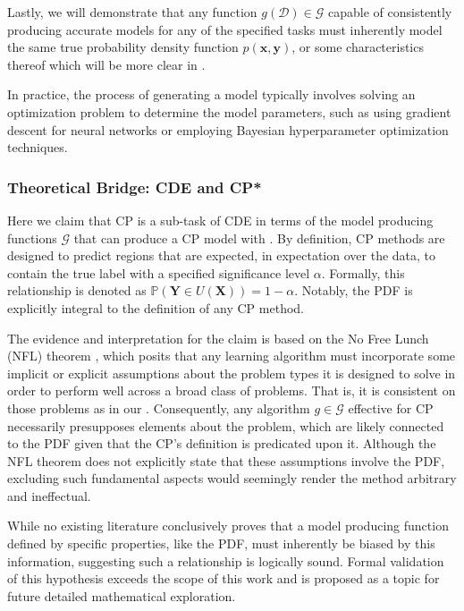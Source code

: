 Lastly, we will demonstrate that any function $g(\mathcal{D}) \in \mathcal{G}$ capable of consistently producing accurate models for any of the specified tasks must inherently model the same true probability density function $p(\mathbf{x}, \mathbf{y})$, or some characteristics thereof which will be more clear in .

In practice, the process of generating a model typically involves solving an optimization problem to determine the model parameters, such as using gradient descent for neural networks or employing Bayesian hyperparameter optimization techniques.

\subsubsection{Theoretical Bridge: CDE and CP*}\label{sec:bridge_cde_cp}

Here we claim that CP is a sub-task of CDE in terms of the model producing functions $\mathcal{G}$ that can produce a CP model with . By definition, CP methods are designed to predict regions that are expected, in expectation over the data, to contain the true label with a specified significance level $\alpha$. Formally, this relationship is denoted as $\mathbb{P}(\mathbf{Y} \in U(\mathbf{X})) = 1 - \alpha$. Notably, the PDF is explicitly integral to the definition of any CP method.

The evidence and interpretation for the claim is based on the No Free Lunch (NFL) theorem \cite{wolpert1997no}, which posits that any learning algorithm must incorporate some implicit or explicit assumptions about the problem types it is designed to solve in order to perform well across a broad class of problems. That is, it is consistent on those problems as in our . Consequently, any algorithm $g \in \mathcal{G}$ effective for CP necessarily presupposes elements about the problem, which are likely connected to the PDF given that the CP's definition is predicated upon it. Although the NFL theorem does not explicitly state that these assumptions involve the PDF, excluding such fundamental aspects would seemingly render the method arbitrary and ineffectual.

While no existing literature conclusively proves that a model producing function defined by specific properties, like the PDF, must inherently be biased by this information, suggesting such a relationship is logically sound. Formal validation of this hypothesis exceeds the scope of this work and is proposed as a topic for future detailed mathematical exploration.

